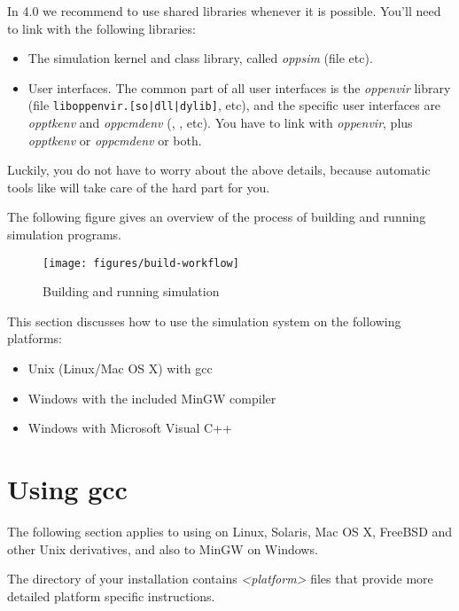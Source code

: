 In {\opp} 4.0 we recommend to use shared libraries whenever it is possible.
You'll need to link with the following libraries:

\begin{itemize}
  \item{The simulation kernel and class library,
    called \textit{oppsim} (file  etc).}
  \item{User interfaces. The common part of all user interfaces is
    the \textit{oppenvir} library (file \texttt{liboppenvir.[so|dll|dylib]}, etc),
    and the specific user interfaces are \textit{opptkenv} and \textit{oppcmdenv}
    (, , etc).
    You have to link with \textit{oppenvir}, plus \textit{opptkenv} or
    \textit{oppcmdenv} or both.}
\end{itemize}

Luckily, you do not have to worry about the above details, because
automatic tools like  will take care of the hard
part for you.

The following figure gives an overview of the process of building
and running simulation programs.

\begin{figure}[htbp]
  \begin{center}
    \texttt{[image: figures/build-workflow]}
    \caption{Building and running simulation}
  \end{center}
\end{figure}


This section discusses how to use the simulation system on the
following platforms:
\begin{itemize}
  \item{Unix (Linux/Mac OS X) with gcc}
  \item{Windows with the included MinGW compiler}
  \ifcommercial\item{Windows with Microsoft Visual C++}\fi
\end{itemize}


\section{Using gcc}

The following section applies to using {\opp} on Linux, Solaris, Mac OS X, FreeBSD and
other Unix derivatives, and also to MinGW on Windows.

\begin{note}
The  directory of your {\opp} installation contains
\textit{<platform>} files that provide more detailed platform specific instructions.
\end{note}


